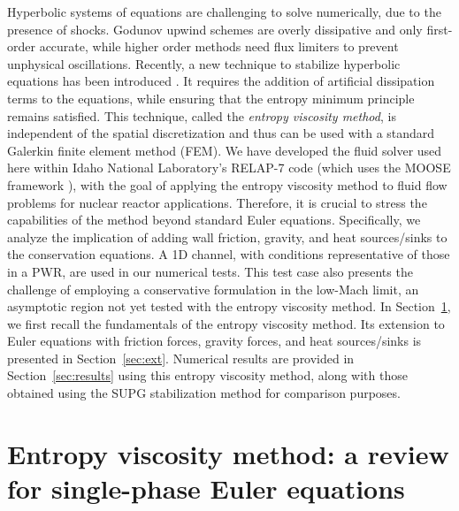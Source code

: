 \documentclass[12pt]{article}
\begin{document}
Hyperbolic systems of equations are challenging to solve numerically, due to the presence of shocks. Godunov upwind schemes are overly
dissipative and only first-order accurate, while higher order methods need flux  limiters to prevent unphysical oscillations. Recently,
a new technique to stabilize hyperbolic equations has been introduced \cite{valentin, jlg1, jlg2} . 
It requires the addition of artificial dissipation terms to the equations, while ensuring that the entropy minimum principle remains satisfied. 
This technique, called the \emph{entropy viscosity method}, is independent of the spatial discretization and thus can be used with a standard 
Galerkin finite element method (FEM).  We have developed the fluid solver used here within Idaho National Laboratory's RELAP-7 code \cite{relap7} (which uses the MOOSE framework \cite{Moose}), with the goal of applying the entropy viscosity method to fluid flow problems for nuclear reactor applications. Therefore, it is crucial to stress the capabilities of the method beyond standard Euler equations. Specifically, we analyze the implication of adding wall friction, gravity, and heat sources/sinks to the conservation equations.
A 1D channel, with conditions representative of those in a PWR, are used in our numerical tests. This test case also presents the challenge
of employing a conservative formulation in the low-Mach limit, an asymptotic region not yet tested with the entropy viscosity method. In Section~\ref{sec:section1}, we first recall
the fundamentals of the entropy viscosity method.  Its extension to Euler equations with friction forces, gravity forces, and heat sources/sinks is presented in Section~\ref{sec:ext}. Numerical results are provided in Section~\ref{sec:results} using this entropy viscosity method, along with those obtained using the SUPG stabilization method  \cite{SUPG} for comparison purposes.


%
\section{Entropy viscosity method: a review for single-phase Euler equations}
\label{sec:section1}
\end{document}
